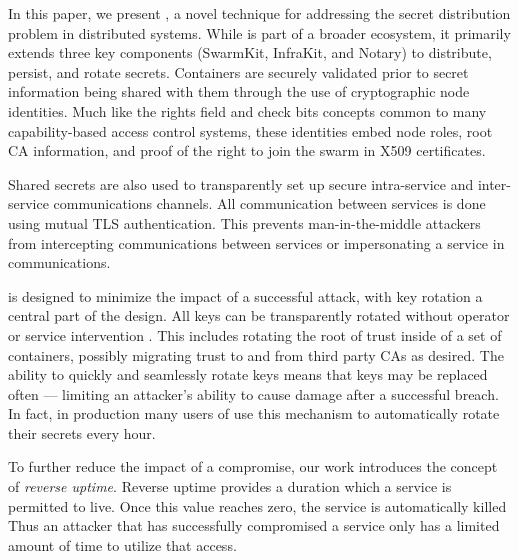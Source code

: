 %




In this paper, we present \sysname, a novel technique for addressing
the secret distribution problem in distributed systems.  While
\sysname is part of a broader ecosystem, it primarily extends three key 
components (SwarmKit, InfraKit, and Notary) to distribute, persist, and 
rotate secrets.  Containers are securely validated prior to secret 
information being shared with them through the use of cryptographic node
identities.  Much like the rights field and check bits concepts common
to many capability-based access control systems, these identities embed
node roles, root CA information, and proof of the right to join the swarm
in X509 certificates.  

Shared secrets are also used to transparently set up secure intra-service 
and inter-service communications channels.  All communication between
services  is done using mutual
TLS authentication.  This prevents man-in-the-middle attackers from
intercepting communications between services or impersonating a service
in communications.  

\sysname is designed to minimize the impact of a successful attack, with
key rotation a central part of the design.  All keys can be transparently
rotated without operator or service intervention .  
This includes rotating the root of trust inside of a set of containers,
possibly migrating trust to and from third party CAs as desired.   The
ability to quickly and seamlessly rotate keys  means that keys may be 
replaced often --- limiting an attacker's ability to cause damage after 
a successful breach.  In fact, in production many users of \sysname
use this mechanism to automatically rotate their secrets every hour.

To further reduce the impact of a compromise, our work introduces the 
concept of \emph{reverse uptime}.  Reverse uptime provides a duration which
a service is permitted to live.  Once this value reaches zero, the service
is automatically killed   Thus an attacker that has successfully compromised a
service only has a limited amount of time to utilize that access.

